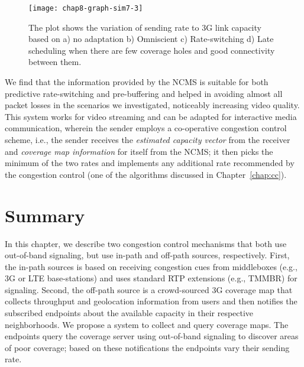 \begin{figure}
\texttt{[image: chap8-graph-sim7-3]}
  \caption{The plot shows the variation of sending rate to 3G link capacity
  based on a) no adaptation b) Omniscient c) Rate-switching d) Late scheduling
  when there are few coverage holes and good connectivity between them.}
\label{fig:glass:sim7res}
\end{figure}


We find that the information provided by the NCMS is suitable for both
predictive rate-switching and  pre-buffering and helped in avoiding almost all
packet losses in the scenarios we investigated, noticeably increasing video
quality. This system works for video streaming and can be adapted for
interactive media communication, wherein the sender employs a co-operative
congestion control scheme, i.e., the sender receives the \emph{estimated
capacity vector} from the receiver and \emph{coverage map information} for
itself from the NCMS; it then picks the minimum of the two rates and implements any
additional rate recommended by the congestion control (one of the algorithms
discussed in Chapter~\ref{chap:cc}).

\section{Summary}

In this chapter, we describe two congestion control mechanisms that both use 
out-of-band signaling, but use in-path and off-path sources, respectively. First,
the in-path sources is based on receiving congestion cues from middleboxes
(e.g., 3G or LTE base-stations) and uses standard RTP extensions (e.g., TMMBR)
for signaling. Second, the off-path source is a crowd-sourced 3G coverage
map that collects throughput and geolocation information from users and then
notifies the subscribed endpoints about the available capacity in their
respective neighborhoods. We propose a system to collect and query coverage
maps. The endpoints query the coverage server using out-of-band signaling to
discover areas of poor coverage; based on these notifications the endpoints
vary their sending rate.

